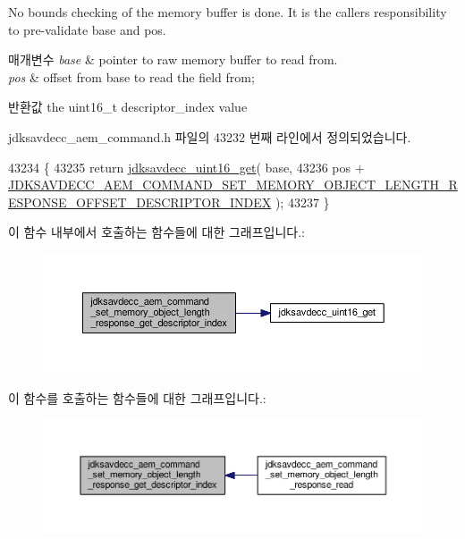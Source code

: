 No bounds checking of the memory buffer is done. It is the caller\textquotesingle{}s responsibility to pre-\/validate base and pos.


\begin{DoxyParams}{매개변수}
{\em base} & pointer to raw memory buffer to read from. \\
\hline
{\em pos} & offset from base to read the field from; \\
\hline
\end{DoxyParams}
\begin{DoxyReturn}{반환값}
the uint16\+\_\+t descriptor\+\_\+index value 
\end{DoxyReturn}


jdksavdecc\+\_\+aem\+\_\+command.\+h 파일의 43232 번째 라인에서 정의되었습니다.


\begin{DoxyCode}
43234 \{
43235     \textcolor{keywordflow}{return} \hyperlink{group__endian_ga3fbbbc20be954aa61e039872965b0dc9}{jdksavdecc\_uint16\_get}( base,
43236                                   pos + 
      \hyperlink{group__command__set__memory__object__length__response_ga6890fad23c43d12a05e2c1f154304401}{JDKSAVDECC\_AEM\_COMMAND\_SET\_MEMORY\_OBJECT\_LENGTH\_RESPONSE\_OFFSET\_DESCRIPTOR\_INDEX}
       );
43237 \}
\end{DoxyCode}


이 함수 내부에서 호출하는 함수들에 대한 그래프입니다.\+:
\nopagebreak
\begin{figure}[H]
\begin{center}
\leavevmode
\includegraphics[width=350pt]{group__command__set__memory__object__length__response_gae2647ba54d0e05d4c4194a436606b035_cgraph}
\end{center}
\end{figure}




이 함수를 호출하는 함수들에 대한 그래프입니다.\+:
\nopagebreak
\begin{figure}[H]
\begin{center}
\leavevmode
\includegraphics[width=350pt]{group__command__set__memory__object__length__response_gae2647ba54d0e05d4c4194a436606b035_icgraph}
\end{center}
\end{figure}


